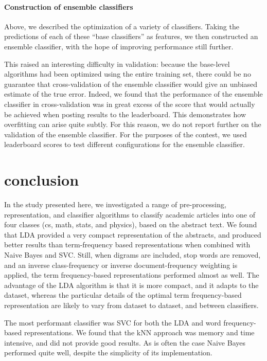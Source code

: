 \documentclass[conference,letterpaper]{IEEEtran}
\begin{document}
\paragraph*{Construction of ensemble classifiers}
Above, we described the optimization of a variety of classifiers.  Taking 
the predictions of each of these ``base classifiers'' as features, we then 
constructed an ensemble classifier, with the hope of improving performance
still further.

This raised an interesting difficulty in validation: because the base-level
algorithms had been optimized using the entire training set, there could be
no guarantee that cross-validation of the ensemble classifier would give 
an unbiased estimate of the true error.
Indeed, we found that the performance of the ensemble classifier in 
cross-validation was in great excess of the score that would actually be
achieved when posting results to the leaderboard.  This demonstrates how
overfitting can arise quite subtly.  For this reason, we do not report further
on the validation of the ensemble classifier.  For the purposes of the 
contest, we used leaderboard scores to test different configurations for the
ensemble classifier.

\section{conclusion}
In the study presented here, we investigated a range of pre-processing,
representation, and classifier algorithms to classify academic
articles into one of four classes (cs, math, stats, and physics), based on 
the abstract text.  We found that LDA provided a very compact representation 
of the abstracts, and produced better results than term-frequency based 
representations when combined with Naive Bayes and SVC.  Still, when 
digrams are included, stop words are removed, and an inverse class-frequency
or inverse document-frequency weighting is applied, the term frequency-based
representations performed almost as well.  The advantage of the LDA algorithm
is that it is more compact, and it adapts to the dataset, whereas the 
particular details of the optimal term frequency-based representation are
likely to vary from dataset to dataset, and between classifiers.

The most performant classifier was SVC for both the LDA and word 
frequency-based representations.  We found that the kNN approach was memory 
and time intensive, and did not provide good results.  As is often the case
Naive Bayes performed quite well, despite the simplicity of its implementation.
\end{document}
